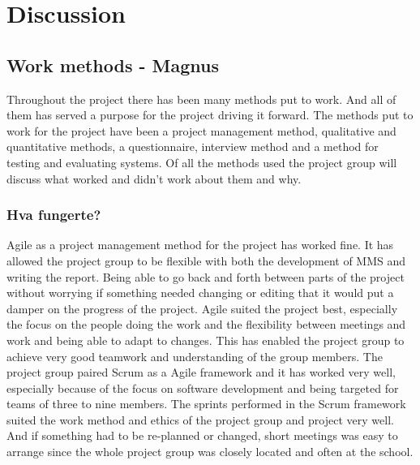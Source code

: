 \chapter{Discussion}

\section{Work methods - Magnus}
Throughout the project there has been many methods put to work. And all of them has served a purpose for the project driving it forward. The methods put to work for the project have been a project management method, qualitative and quantitative methods, a questionnaire, interview method and a method for testing and evaluating systems. Of all the methods used the project group will discuss what worked and didn't work about them and why.          
\subsection{Hva fungerte?}
Agile as a project management method for the project has worked fine. It has allowed the project group to be flexible with both the development of MMS and writing the report. Being able to go back and forth between parts of the project without worrying if something needed changing or editing that it would put a damper on the progress of the project. Agile suited the project best, especially the focus on the people doing the work and the flexibility between meetings and work and being able to adapt to changes. This has enabled the project group to achieve very good teamwork and understanding of the group members. The project group paired Scrum as a Agile framework and it has worked very well, especially because of the focus on software development and being targeted for teams of three to nine members. The sprints performed in the Scrum framework suited the work method and ethics of the project group and project very well. And if something had to be re-planned or changed, short meetings was easy to arrange since the whole project group was closely located and often at the school.

